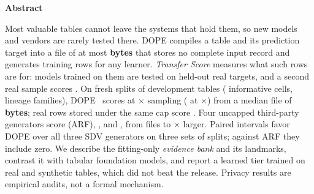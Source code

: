 \documentclass[10pt,letterpaper,twocolumn]{article}
\newcommand{\x}{\ensuremath{\times}}
\begin{document}
\begin{center}
\begin{minipage}{0.88\textwidth}
{\centering\bfseries\fontsize{10}{12}\selectfont Abstract\par}\vspace{4pt}
\fontsize{9.6}{12.2}\selectfont\noindent
Most valuable tables cannot leave the systems that hold them, so new models and vendors are rarely tested there.
DOPE compiles a table and its prediction target into a file of at most \textbf{ bytes} that stores no complete input record and generates training rows for any learner.
\emph{Transfer Score} measures what such rows are for: models trained on them are tested on held-out real targets, and a second real sample scores \textbf{}.
On fresh splits of development tables ( informative cells,  lineage families), DOPE~ scores \textbf{} at \x{} sampling ( at \x) from a median file of \textbf{ bytes}; real rows stored under the same cap score .
Four uncapped third-party generators score  (ARF), ,  and , from files  to \x{} larger.
Paired intervals favor DOPE over all three SDV generators on three sets of splits; against ARF they include zero.
We describe the fitting-only \emph{evidence bank} and its landmarks, contrast it with tabular foundation models, and report a learned tier trained on real and synthetic tables, which did not beat the release.
Privacy results are empirical audits, not a formal mechanism.
\end{minipage}
\end{center}
\vspace{4pt}
\end{document}
